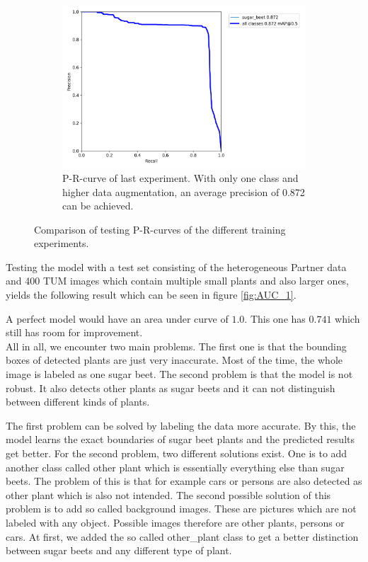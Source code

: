 \begin{figure}[htb!]
\begin{subfigure}{1\textwidth}
		\centering
		\includegraphics[scale=0.08]{figures/yes_pre_high_dat.png}
		\caption{P-R-curve of last experiment. With only one class and higher data augmentation, an average precision of 0.872 can be achieved.}
		\label{fig:AUC_5}
	\end{subfigure}
	\caption{Comparison of testing P-R-curves of the different training experiments.}
	\label{fig:AUC_comparison}
\end{figure}

Testing the model with a test set consisting of the heterogeneous Partner data and 400 TUM images which contain multiple small plants and also larger ones, yields the following result which can be seen in figure \ref{fig:AUC_1}.

A perfect model would have an area under curve of $ 1.0 $. This one has $ 0.741 $ which still has room for improvement.\\


All in all, we encounter two main problems. The first one is that the bounding boxes of detected plants are just very inaccurate. Most of the time, the whole image is labeled as one sugar beet. The second problem is that the model is not robust. It also detects other plants as sugar beets and it can not distinguish between different kinds of plants.

The first problem can be solved by labeling the data more accurate. By this, the model learns the exact boundaries of sugar beet plants and the predicted results get better. For the second problem, two different solutions exist. One is to add another class called other plant which is essentially everything else than sugar beets. The problem of this is that for example cars or persons are also detected as other plant which is also not intended. The second possible solution of this problem is to add so called background images. These are pictures which are not labeled with any object. Possible images therefore are other plants, persons or cars. At first, we added the so called other\_plant class to get a better distinction between sugar beets and any different type of plant. \\

